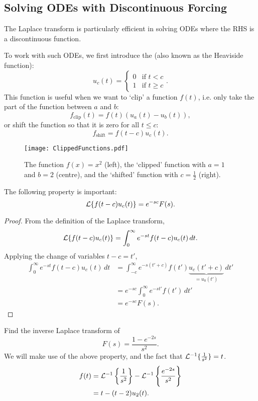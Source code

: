 \subsection{Solving ODEs with Discontinuous Forcing}

The Laplace transform is particularly efficient in solving ODEs where the RHS is a discontinuous function.

To work with such ODEs, we first introduce the  (also known as the Heaviside function):
\begin{equation}
	u_c(t) = \begin{cases}0 & \text{if } t<c \\ 1 & \text{if } t \geq c\end{cases}.
\end{equation}
This function is useful when we want to `clip' a function $f(t)$, i.e. only take the part of the function between $a$ and $b$:
\[
f_{\text{clip}}(t) = f(t)\left(u_a(t) - u_b(t)\right),
\]
or shift the function so that it is zero for all $t \leq c$:
\[
f_{\text{shift}} = f(t-c)u_c(t).
\]

\begin{figure}[!ht]
	\centering
	\texttt{[image: ClippedFunctions.pdf]}
	\caption{The function $f(x)=x^2$ (left), the `clipped' function with $a=1$ and $b=2$ (centre), and the `shifted' function with $c=\frac12$ (right).}
	\label{fig:clipping}
\end{figure}

The following property is important:
\begin{equation}\label{eq:laplacediscont}
	\mathcal{L}\{f(t-c)u_c(t)\} = e^{-sc}F(s).
\end{equation}

\begin{proof}
	From the definition of the Laplace transform,
	\[
	\mathcal{L}\{f(t-c)u_c(t)\} = \int_0^{\infty} e^{-st}f(t-c)u_c(t) \,dt.
	\]
	Applying the change of variables $t-c=t'$,
	\begin{align*}
		\int_0^{\infty} e^{-st}f(t-c)u_c(t) \,dt &= \int_{-c}^{\infty} e^{-s(t'+c)}f(t') \underbrace{u_c(t'+c)}_{=u_0(t')} \,dt' \\
		&= e^{-sc} \int_0^{\infty} e^{-st'}f(t') \,dt' \\
		&= e^{-sc} F(s).
	\end{align*}
\end{proof}

\begin{eg}
	Find the inverse Laplace transform of 
	\[
	F(s) = \frac{1-e^{-2s}}{s^2}.
	\]
	We will make use of the above property, and the fact that $\mathcal{L}^{-1}\{\frac{1}{s^2}\} = t$.
	\begin{align*}
		f(t) &= \mathcal{L}^{-1}\left\{\frac{1}{s^2}\right\} - \mathcal{L}^{-1}\left\{\frac{e^{-2s}}{s^2}\right\} \\
		&= t - (t-2)u_2(t).
	\end{align*}
\end{eg}

